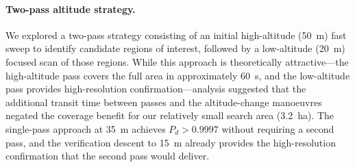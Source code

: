 \paragraph{Two-pass altitude strategy.}
We explored a two-pass strategy consisting of an initial high-altitude (\SI{50}{\metre}) fast sweep to identify candidate regions of interest, followed by a low-altitude (\SI{20}{\metre}) focused scan of those regions.  While this approach is theoretically attractive---the high-altitude pass covers the full area in approximately \SI{60}{\second}, and the low-altitude pass provides high-resolution confirmation---analysis suggested that the additional transit time between passes and the altitude-change manoeuvres negated the coverage benefit for our relatively small search area (\SI{3.2}{\hectare}).  The single-pass approach at \SI{35}{\metre} achieves $P_d > 0.9997$ without requiring a second pass, and the verification descent to \SI{15}{\metre} already provides the high-resolution confirmation that the second pass would deliver.
